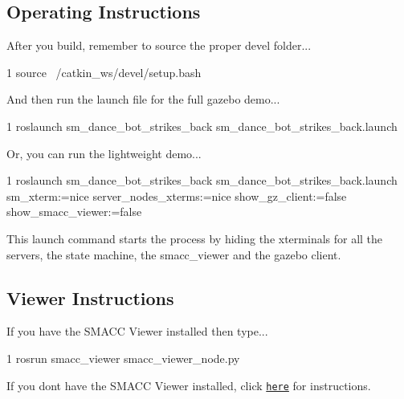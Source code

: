  \subsection*{Operating Instructions}

After you build, remember to source the proper devel folder...


\begin{DoxyCode}
1 source ~/catkin\_ws/devel/setup.bash
\end{DoxyCode}


And then run the launch file for the full gazebo demo...


\begin{DoxyCode}
1 roslaunch sm\_dance\_bot\_strikes\_back sm\_dance\_bot\_strikes\_back.launch
\end{DoxyCode}


Or, you can run the lightweight demo...


\begin{DoxyCode}
1 roslaunch sm\_dance\_bot\_strikes\_back sm\_dance\_bot\_strikes\_back.launch sm\_xterm:=nice
       server\_nodes\_xterms:=nice show\_gz\_client:=false show\_smacc\_viewer:=false
\end{DoxyCode}


This launch command starts the process by hiding the xterminals for all the servers, the state machine, the smacc\+\_\+viewer and the gazebo client.

\subsection*{Viewer Instructions}

If you have the S\+M\+A\+CC Viewer installed then type...


\begin{DoxyCode}
1 rosrun smacc\_viewer smacc\_viewer\_node.py
\end{DoxyCode}


If you don\textquotesingle{}t have the S\+M\+A\+CC Viewer installed, click \href{http://smacc.ninja/smacc-viewer/}{\tt here} for instructions. 